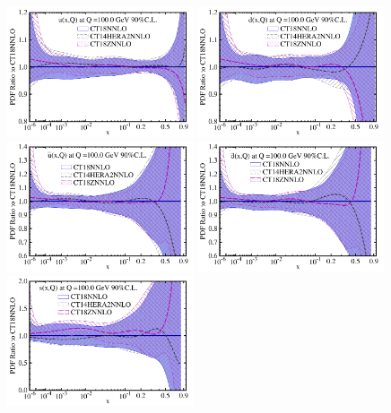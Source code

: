 \begin{figure}[p]
	\center
	\includegraphics[width=0.49\textwidth]{./fig/u_100_CT18.pdf}
	\includegraphics[width=0.49\textwidth]{./fig/d_100_CT18.pdf}
	\includegraphics[width=0.49\textwidth]{./fig/ubar_100_CT18.pdf}
	\includegraphics[width=0.49\textwidth]{./fig/dbar_100_CT18.pdf}
	\includegraphics[width=0.49\textwidth]{./fig/s_100_CT18.pdf}

\end{figure}
